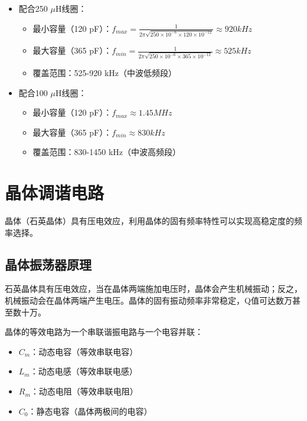 \begin{itemize}
  \item 配合250 $\mu$H线圈：
    \begin{itemize}
      \item 最小容量（120 pF）：$ f_{max} = \frac{1}{2\pi\sqrt{250\times10^{-6} \times 120\times10^{-12}}} \approx 920 kHz $
      \item 最大容量（365 pF）：$ f_{min} = \frac{1}{2\pi\sqrt{250\times10^{-6} \times 365\times10^{-12}}} \approx 525 kHz $
      \item 覆盖范围：525-920 kHz（中波低频段）
    \end{itemize}
  \item 配合100 $\mu$H线圈：
    \begin{itemize}
      \item 最小容量（120 pF）：$ f_{max} \approx 1.45 MHz $
      \item 最大容量（365 pF）：$ f_{min} \approx 830 kHz $
      \item 覆盖范围：830-1450 kHz（中波高频段）
    \end{itemize}
\end{itemize}

\section{晶体调谐电路}
\label{sec:crystal_tuning_circuits}

晶体（石英晶体）具有压电效应，利用晶体的固有频率特性可以实现高稳定度的频率选择。

\subsection{晶体振荡器原理}
\label{sec:crystal_oscillator_principle}

石英晶体具有压电效应，当在晶体两端施加电压时，晶体会产生机械振动；反之，机械振动会在晶体两端产生电压。晶体的固有振动频率非常稳定，Q值可达数万甚至数十万。

晶体的等效电路为一个串联谐振电路与一个电容并联：

\begin{itemize}
    \item $C_m$：动态电容（等效串联电容）
    \item $L_m$：动态电感（等效串联电感）
    \item $R_m$：动态电阻（等效串联电阻）
    \item $C_0$：静态电容（晶体两极间的电容）
\end{itemize}


